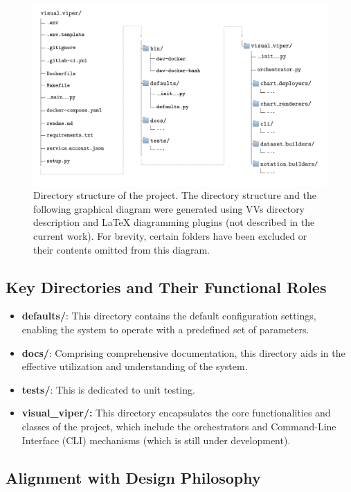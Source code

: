 \begin{figure}[ht]
  \centering
  \includegraphics[width=\textwidth]{media/fig10.png}
  \caption{Directory structure of the project. The directory structure
  and the following graphical diagram were generated using
  VV\textquotesingle s directory description and LaTeX diagramming plugins
  (not described in the current work). For brevity, certain folders have
  been excluded or their contents omitted from this diagram.}
  \label{fig:folders}
\end{figure}


\subsection{Key Directories and Their Functional
Roles}\label{key-directories-and-their-functional-roles}

\begin{itemize}
\item
  \textbf{defaults/}: This directory contains the default configuration
  settings, enabling the system to operate with a predefined set of
  parameters.
\item
  \textbf{docs/}: Comprising comprehensive documentation, this directory
  aids in the effective utilization and understanding of the system.
\item
  \textbf{tests/}: This is dedicated to unit testing.
\item
  \textbf{visual\_viper/:} This directory encapsulates the core
  functionalities and classes of the project, which include the
  orchestrators and Command-Line Interface (CLI) mechanisms (which is
  still under development).
\end{itemize}

\subsection{Alignment with Design
Philosophy}\label{alignment-with-design-philosophy}

